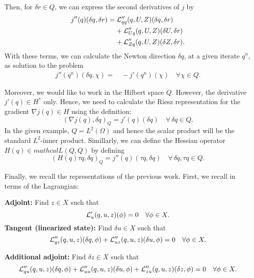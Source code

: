 {Then, for $\delta r\in Q$, we can express the second derivatives of $j$ by
\begin{align*}
j''(q)(\delta q, \delta r) 
&= {\cal L}_{qq}'' (q,U,Z)(\delta q,\delta r) \\
&\;\;\;\;+ {\cal L}_{Uq}'' (q,U,Z)(\delta U,\delta r) \\ 
&\;\;\;\;+ {\cal L}_{Zq}'' (q,U,Z)(\delta Z,\delta r).
\end{align*}
With these terms, we can calculate the Newton direction $\delta q$, at a given 
iterate $q^n$, as solution to the problem
\begin{align*}
j''(q^n )(\delta q,\chi ) =&\, -j'(q^n)(\chi) \quad\forall\chi \in Q.
\end{align*}

Moreover, we would like to work in the Hilbert space $Q$. However, the derivative 
$j'(q) \in H^*$ only. Hence, we need to calculate the Riesz representation 
for the gradient $\nabla j(q) \in H$ using the definition:
\[
 (\nabla j(q),\delta q)_Q = j'(q)(\delta q) \quad \forall\,\delta q\in Q.
\]
In the given example, $Q = L^2(\Omega)$ and hence the scalar product will be the
standard $L^2$-inner product. Simillarly, we can define the Hessian operator 
$H(q) \in mathcal L(Q,Q)$ by defining
\[
 (H(q)\tau q,\delta q)_Q = j''(q)(\tau q,\delta q) \quad \forall\,\delta q,\tau q\in Q.
\]
}

Finally, we recall the representations of the previous work. First, we recall 
in terms of the Lagrangian:

\textbf{Adjoint:} Find $z\in X$ such that
\begin{equation*}
{\cal L}_u' (q,u,z)(\phi) = 0 \quad \forall\phi\in X. 
\end{equation*}
\textbf{Tangent (linearized state):} Find $\delta u\in X$ such that
\begin{equation*}
{\cal L}_{qz}'' (q,u,z)(\delta q, \phi) +
{\cal L}_{uz}'' (q,u,z)(\delta u, \phi) = 0 \quad \forall\phi\in X. 
\end{equation*}

\textbf{Additional adjoint:} Find $\delta z\in X$ such that
\begin{equation*}
{\cal L}_{qu}'' (q,u,z)(\delta q, \phi) +
{\cal L}_{uu}'' (q,u,z)(\delta u, \phi) +
{\cal L}_{zu}'' (q,u,z)(\delta z, \phi) = 0 \quad \forall\phi\in X. 
\end{equation*}

